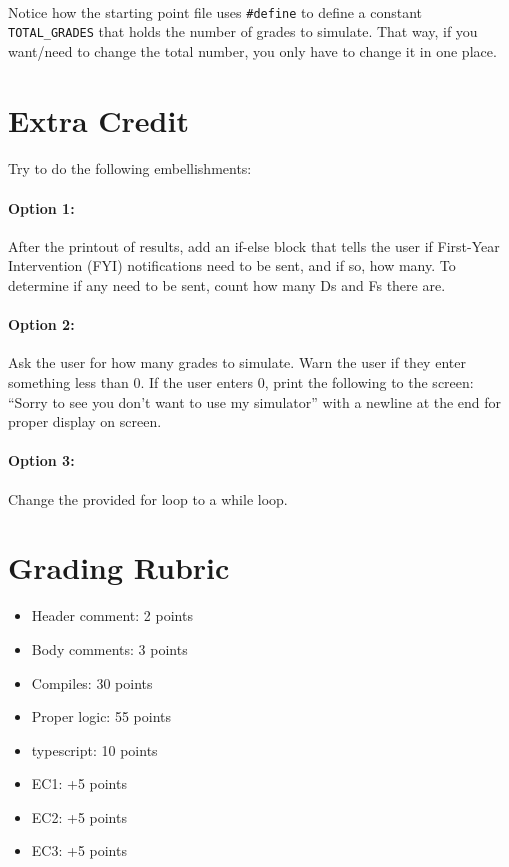 \documentclass[letter,11pt]{article}
\begin{document}
\paragraph{}Notice how the starting point file uses \texttt{\#define} to define a constant \texttt{TOTAL\_GRADES} that holds the number of grades to simulate. That way, if you want/need to change the total number, you only have to change it in one place.

\section*{Extra Credit}
\paragraph{}Try to do the following embellishments:

\paragraph{Option 1:} After the printout of results, add an if-else block that tells the user if First-Year Intervention (FYI) notifications need to be sent, and if so, how many. To determine if any need to be sent, count how many Ds and Fs there are.

\paragraph{Option 2:} Ask the user for how many grades to simulate. Warn the user if they enter something less than 0. If the user enters 0, print the following to the screen: “Sorry to see you don’t want to use my simulator” with a newline at the end for proper display on screen.

\paragraph{Option 3:} Change the provided for loop to a while loop.

\section*{Grading Rubric}
\begin{itemize}
    \item Header comment: 2 points
    \item Body comments: 3 points
    \item Compiles: 30 points
    \item Proper logic: 55 points
    \item typescript: 10 points
    \item EC1: +5 points
    \item EC2: +5 points
    \item EC3: +5 points
\end{itemize}
\end{document}
